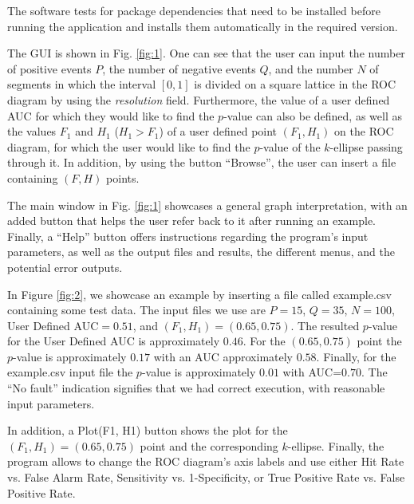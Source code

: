 \documentclass[preprint,12pt]{elsarticle}
\begin{document}
The software tests for package dependencies that need to be installed before running the application and installs them automatically in the required version.


The GUI is shown in Fig. \ref{fig:1}. One can see that the user can input the number of positive events $P$, the number of negative events $Q$, and the number $N$ of segments in which the interval $[0,1]$ is divided on a square lattice in the ROC diagram by using the \textit{resolution} field. Furthermore, the value of a user defined AUC for which they would like to find the $p$-value can also be defined, as well as the values $F_1$ and $H_1$ ($H_1 > F_1$) of a user defined point $(F_1,H_1)$ on the ROC diagram, for which the user would like to find the $p$-value of the $k$-ellipse passing through it. In addition, by using the button ``Browse'', the user can insert a file containing $(F,H)$ points.

The main window in Fig. \ref{fig:1} showcases a general graph interpretation, with an added button that helps the user refer back to it after running an example. Finally, a ``Help'' button offers instructions regarding the program's input parameters, as well as the output files and results, the different menus, and the potential error outputs.

In Figure \ref{fig:2}, we showcase an example by inserting a file called example.csv containing some test data. The input files we use are $P=15$, $Q=35$, $N=100$, User Defined AUC$=0.51$, and $(F_1,H_1)=(0.65,0.75)$. The resulted $p$-value for the User Defined AUC is approximately $0.46$.  For the $(0.65,0.75)$ point the $p$-value is approximately $0.17$ with an AUC approximately $0.58$. Finally, for the example.csv input file the $p$-value is approximately $0.01$ with AUC=$0.70$. The ``No fault'' indication signifies that we had correct execution, with reasonable input parameters.

In addition, a Plot(F1, H1) button shows the plot for the $(F_1,H_1)=(0.65,0.75)$ point and the corresponding $k$-ellipse. Finally, the program allows to change the ROC diagram's axis labels and use either Hit Rate vs. False Alarm Rate, Sensitivity vs. 1-Specificity, or True Positive Rate vs. False Positive Rate. 
\end{document}

